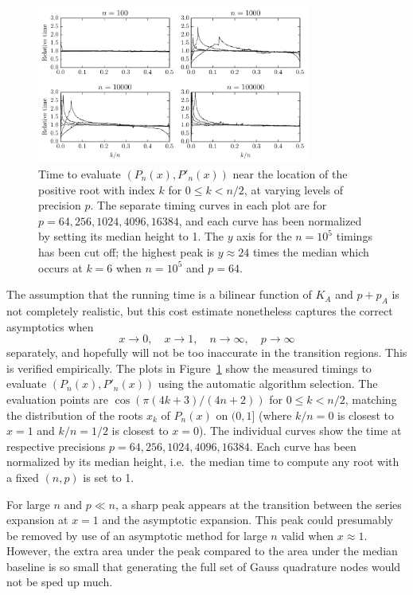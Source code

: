 \documentclass[11pt,a4paper]{article}
\begin{document}
\begin{figure}[h!]
\begin{centering}
\includegraphics[width=0.8\textwidth]{timeplot}
\caption{Time to evaluate $(P_n(x), P'_n(x))$ near the location of the positive root with index $k$ for $0 \le k < n/2$, at varying levels of precision $p$.
The separate timing curves in each plot are for $p = 64, 256, 1024, 4096, 16384$, and each curve has been normalized by setting its median height to 1. The $y$ axis for the $n = 10^5$ timings has been cut off; the highest peak is $y \approx 24$ times the median which occurs at $k = 6$ when $n = 10^5$ and $p = 64$.}
\label{fig:timeplot}
\end{centering}
\end{figure}

The assumption that the running time is a bilinear function of $K_A$ and $p + p_A$ is not completely realistic, but this cost estimate nonetheless captures the correct asymptotics when
$$x \to 0, \quad x \to 1, \quad n \to \infty, \quad p \to \infty$$
separately, and hopefully will not be too inaccurate in the transition regions. This is verified empirically. The plots in Figure~\ref{fig:timeplot} show the measured
timings to evaluate $(P_n(x), P'_n(x))$ using the automatic algorithm selection.
The evaluation points are $\cos(\pi (4k+3)/(4n+2))$ for $0 \le k < n/2$, matching
the distribution of the roots $x_k$ of $P_n(x)$ on $(0,1]$ (where $k/n = 0$ is closest to $x = 1$ and $k/n = 1/2$ is closest to $x = 0$).
The individual curves show the time at respective precisions $p = 64, 256, 1024, 4096, 16384$.
Each curve has been normalized by its median height, i.e.\ the median time to compute any root with a fixed $(n,p)$ is set to 1.

For large $n$ and $p \ll n$, a sharp peak appears at the transition between the series expansion at $x = 1$ and the asymptotic expansion. This peak could presumably be removed by use of an asymptotic method for large $n$ valid when $x \approx 1$. However, the extra area under the peak compared to the area under the median baseline is so small that generating the full set of Gauss quadrature nodes would not be sped up much.
\end{document}
